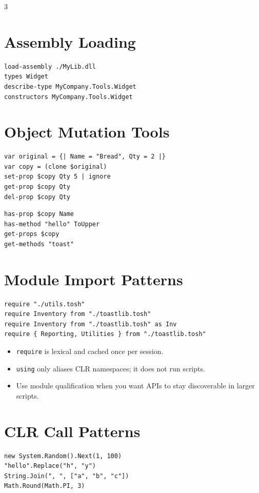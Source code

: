 \begin{multicols*}{3}
\section{Assembly Loading}
\begin{lstlisting}
load-assembly ./MyLib.dll
types Widget
describe-type MyCompany.Tools.Widget
constructors MyCompany.Tools.Widget
\end{lstlisting}

\columnbreak

\section{Object Mutation Tools}
\begin{lstlisting}
var original = {| Name = "Bread", Qty = 2 |}
var copy = (clone $original)
set-prop $copy Qty 5 | ignore
get-prop $copy Qty
del-prop $copy Qty
\end{lstlisting}

\begin{lstlisting}
has-prop $copy Name
has-method "hello" ToUpper
get-props $copy
get-methods "toast"
\end{lstlisting}


\section{Module Import Patterns}
\begin{lstlisting}
require "./utils.tosh"
require Inventory from "./toastlib.tosh"
require Inventory from "./toastlib.tosh" as Inv
require { Reporting, Utilities } from "./toastlib.tosh"
\end{lstlisting}

\begin{itemize}
\item \texttt{require} is lexical and cached once per session.
\item \texttt{using} only aliases CLR namespaces; it does not run scripts.
\item Use module qualification when you want APIs to stay discoverable in larger scripts.
\end{itemize}

\section{CLR Call Patterns}
\begin{lstlisting}
new System.Random().Next(1, 100)
"hello".Replace("h", "y")
String.Join(", ", ["a", "b", "c"])
Math.Round(Math.PI, 3)
\end{lstlisting}


\end{multicols*}
